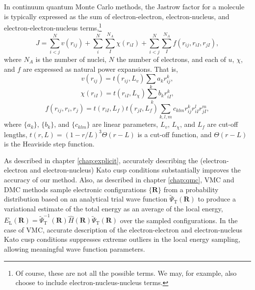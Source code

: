 In continuum quantum Monte Carlo methods, the Jastrow factor for a molecule is typically expressed as the sum of electron-electron, electron-nucleus, and electron-electron-nucleus terms,\footnote{Of course, these are not all the possible terms. We may, for example, also choose to include electron-nucleus-nucleus terms.}
\begin{equation}
    \label{eq:jastrow}
    J = \sum_{i<j}^Nv(r_{ij}) + \sum_i^N\sum_I^{N_A}\chi(r_{iI}) + \sum_{i<j}^N\sum_I^{N_A}f(r_{ij}, r_{iI}, r_{jI}),
\end{equation}
where $N_A$ is the number of nuclei, $N$ the number of electrons, and each of $u$, $\chi$, and $f$ are expressed as natural power expansions.\supercite{drummondJastrow} That is,
\begin{equation}
    \label{eq:dtn-jastrow-ee}
    v(r_{ij})    = t(r_{ij},L_v)
                    \sum_{k} a_k r_{ij}^k ,
\end{equation}
\begin{equation}
    \label{eq:dtn-jastrow-en}
    \chi(r_{iI}) = t(r_{iI},L_\chi)
    \sum_{k} b_k r_{iI}^k ,
\end{equation}
\begin{equation}
    \label{eq:dtn-jastrow-een}
    f(r_{ij}, r_{i}, r_{j}) = t(r_{iI},L_f) t(r_{jI},L_f)
    \sum_{k,l,m} c_{klm}
    r_{ij}^k r_{iI}^l r_{jI}^m ,
\end{equation}
where $\{a_k\}$, $\{b_k\}$, and $\{c_{klm}\}$ are linear parameters,
$L_v$, $L_\chi$, and $L_f$ are cut-off lengths, $t(r,L) = (1-r/L)^3
\Theta(r-L)$ is a cut-off function, and $\Theta(r-L)$ is the Heaviside
step function.

As described in chapter \ref{chap:explicit}, accurately describing the (electron-electron and electron-nucleus) Kato cusp conditions\supercite{katoEigenfunctionsManyparticleSystems1957a} substantially improves the accuracy of our method. Also, as described in chapter \ref{chap:qmc}, \gls{VMC} and \gls{DMC} methods sample electronic configurations $\{\bm R\}$ from a probability distribution based on an analytical trial wave function $\tilde\Psi_{\mathrm T}(\bm R)$ to produce a variational estimate of the total energy as an average of the local energy, $E_{\mathrm L}({\bm R}) = \tilde\Psi_{\mathrm T}^{-1}({\bm R}) \hat H({\bm R}) \tilde\Psi_{\mathrm T}({\bm R})$ over the sampled configurations. In the case of \gls{VMC}, accurate description of the electron-electron and electron-nucleus Kato cusp conditions suppresses extreme outliers in the local energy sampling, allowing meaningful wave function parameters.


